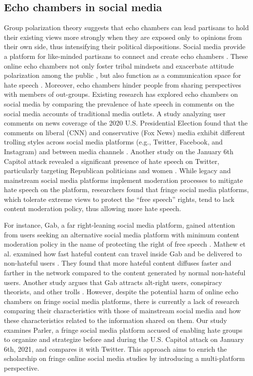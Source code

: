 \documentclass[Crown,sagev,times]{sagej}
\begin{document}
\subsection{Echo chambers in social media} \label{sec:echo_chambers}

Group polarization theory suggests that echo chambers can lead partisans to hold their existing views more strongly when they are exposed only to opinions from their own side, thus intensifying their political dispositions. Social media provide a platform for like-minded partisans to connect and create echo chambers \cite{sunstein2018republic}. These online echo chambers not only foster tribal mindsets and exacerbate attitude polarization among the public \cite{gillani2018me}, but also function as a communication space for hate speech \cite{zannettou2018gab}. Moreover, echo chambers hinder people from sharing perspectives with members of out-groups\cite{dori2021restoring}.
Existing research has explored echo chambers on social media by comparing the prevalence of hate speech in comments on the social media accounts of traditional media outlets. A study analyzing user comments on news coverage of the 2020 U.S. Presidential Election found that the comments on liberal (CNN) and conservative (Fox News) media exhibit different trolling styles across social media platforms (e.g., Twitter, Facebook, and Instagram) and between media channels \cite{fichman2023trolling}. Another study on the January 6th Capitol attack revealed a significant presence of hate speech on Twitter, particularly targeting Republican politicians and women \cite{kim2022violent}. 
While legacy and mainstream social media platforms implement moderation processes to mitigate hate speech on the platform, researchers found that fringe social media platforms, which tolerate extreme views to protect the ``free speech'' rights, tend to lack content moderation policy, thus allowing more hate speech. 

For instance, Gab, a far right-leaning social media platform, gained attention from users seeking an alternative social media platform with minimum content moderation policy in the name of protecting the right of free speech \cite{fair2019shouting}.  
Mathew et al. examined how fast hateful content can travel inside Gab and be delivered to non-hateful users \cite{mathew2019spread}. They found that more hateful content diffuses faster and farther in the network compared to the content generated by normal non-hateful users.
Another study argues that Gab attracts alt-right users, conspiracy theorists, and other trolls \cite{zannettou2018gab}.
However, despite the potential harm of online echo chambers on fringe social media platforms, there is currently a lack of research comparing their characteristics with those of mainstream social media and how these characteristics related to the information shared on them. Our study examines Parler, a fringe social media platform accused of enabling hate groups to organize and strategize before and during the U.S. Capitol attack on January 6th, 2021, and compares it with Twitter. This approach aims to enrich the scholarship on fringe online social media studies by introducing a multi-platform perspective. 
\end{document}
